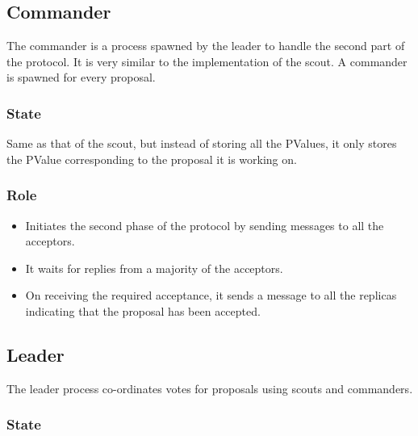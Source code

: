 \subsection{Commander}

The commander is a process spawned by the leader to handle the second part of
the protocol. It is very similar to the implementation of the scout. A commander
is spawned for every proposal.

\subsubsection{State}

Same as that of the scout, but instead of storing all the
PValues, it only stores the PValue corresponding to the proposal it is working
on.

\subsubsection{Role}

\begin{itemize}
  \item Initiates the second phase of the protocol by sending 
    messages to all the acceptors.
  \item It waits for replies from a majority of the acceptors.
  \item On receiving the required acceptance, it sends a message to all the
    replicas indicating that the proposal has been accepted.
\end{itemize}

\subsection{Leader}

The leader process co-ordinates votes for proposals using scouts and commanders.

\subsubsection{State}

